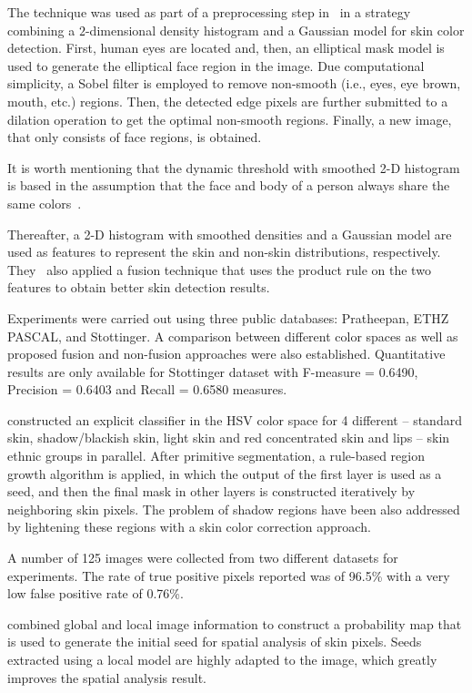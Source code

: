 The technique was used as part of a preprocessing step in~\citet{tan:12} in a strategy combining a $2$-dimensional density histogram and a Gaussian model for skin color detection. First, human eyes are located and, then, an elliptical mask model is used to generate the elliptical face region in the image. Due computational simplicity, a Sobel filter is employed to remove non-smooth (i.e., eyes, eye brown, mouth, etc.) regions. Then, the detected edge pixels are further submitted to a dilation operation to get the optimal non-smooth regions. Finally, a new image, that only consists of face regions, is obtained.

It is worth mentioning that the dynamic threshold with smoothed 2-D histogram is based in the assumption that the face and body of a person always share the same colors~\citep{tan:12}.

Thereafter, a 2-D histogram with smoothed densities and a Gaussian model are used as features to represent the skin and non-skin distributions, respectively. They~\citep{tan:12} also applied a fusion technique that uses the product rule on the two features to obtain better skin detection results.

Experiments were carried out using three public databases: Pratheepan, ETHZ PASCAL, and Stottinger. A comparison between different color spaces as well as proposed fusion and non-fusion approaches were also established. Quantitative results are only available for Stottinger dataset with F-measure = 0.6490, Precision = 0.6403 and Recall = 0.6580 measures.

\citet{naji:12} constructed an explicit classifier in the HSV color space for 4 different -- standard skin, shadow/blackish skin, light skin and red concentrated skin and lips -- skin ethnic groups in parallel. After primitive segmentation, a rule-based region growth algorithm is applied, in which the output of the first layer is used as a seed, and then the final mask in other layers is constructed iteratively by neighboring skin pixels. The problem of shadow regions have been also addressed by lightening these regions with a skin color correction approach.

A number of 125 images were collected from two different datasets for experiments. The rate of true positive pixels reported was of 96.5\% with a very low false positive rate of 0.76\%.

\citet{kawulok:13} combined global and local image information to construct a probability map that is used to generate the initial seed for spatial analysis of skin pixels. Seeds extracted using a local model are highly adapted to the image, which greatly improves the spatial analysis result.

